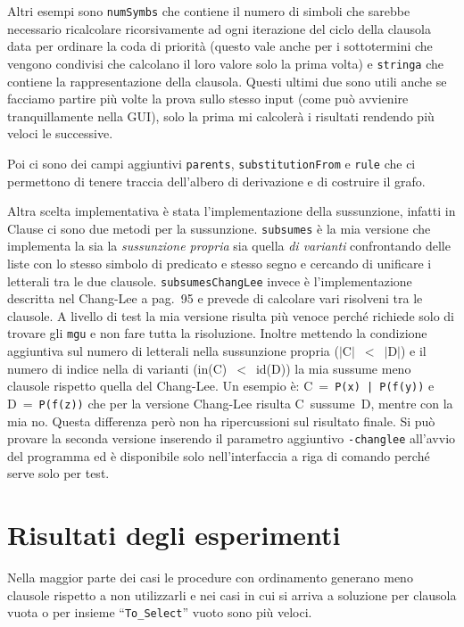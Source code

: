\documentclass[a4paper,11pt]{article} %
\newcommand{\sintassi}{\texttt}
\newcommand{\classe}{\textsf}
\newcommand{\metodo}{\texttt}
\newcommand{\campo}{\texttt}
\newcommand{\cod}{\lstset{basicstyle=\ttfamily}\lstinline}
\begin{document}
Altri esempi sono \cod{numSymbs} che contiene il numero di simboli che sarebbe 
necessario ricalcolare ricorsivamente ad ogni iterazione del ciclo della clausola data
per ordinare la coda di priorità (questo vale anche per i sottotermini che 
vengono condivisi che calcolano il loro valore solo la prima volta)
e \cod{stringa} che contiene la rappresentazione della clausola.
Questi ultimi due sono utili anche se facciamo partire più volte
la prova sullo stesso input (come può avvienire tranquillamente nella GUI), solo la prima mi 
calcolerà i risultati rendendo più veloci le successive.

Poi ci sono dei campi aggiuntivi \cod{parents}, \cod{substitutionFrom} e \cod{rule}
che ci permettono di tenere traccia dell'albero di derivazione e di costruire il
grafo.

Altra scelta implementativa è stata l'implementazione della sussunzione, infatti
in \classe{Clause} ci sono due metodi per la sussunzione. \metodo{subsumes} è la
mia versione che implementa la sia la \emph{sussunzione propria} sia quella 
\emph{di varianti} confrontando delle liste con lo stesso simbolo di predicato e
stesso segno e cercando di unificare i letterali tra le due clausole.
\metodo{subsumesChangLee} invece è l'implementazione descritta nel Chang-Lee
a pag.~95 e prevede di calcolare vari risolveni tra le clausole.
A livello di test la mia versione risulta più venoce perché richiede solo di trovare
gli \metodo{mgu} e non fare tutta la risoluzione. Inoltre mettendo la condizione
aggiuntiva sul numero di letterali nella sussunzione propria 
($|$C$|$~$<$~$|$D$|$) e il numero di indice nella di varianti (in(C)~$<$~id(D))
la mia sussume meno clausole rispetto quella del Chang-Lee. Un esempio è:
C~=~\cod{P(x) | P(f(y))} e D~=~\cod{P(f(z))} che per la versione Chang-Lee risulta
C~sussume~D, mentre con la mia no. Questa differenza però non ha ripercussioni
sul risultato finale. Si può provare la seconda versione inserendo
il parametro aggiuntivo \sintassi{-changlee} all'avvio del programma ed è 
disponibile solo nell'interfaccia a riga di comando perché serve solo per test.


\section{Risultati degli esperimenti}\label{sec: esperimenti}
Nella maggior parte dei casi le procedure con ordinamento generano meno clausole
rispetto a non utilizzarli e nei casi in cui si arriva a soluzione 
per clausola vuota o per insieme ``\campo{To\_Select}'' vuoto sono più veloci.
\end{document}
